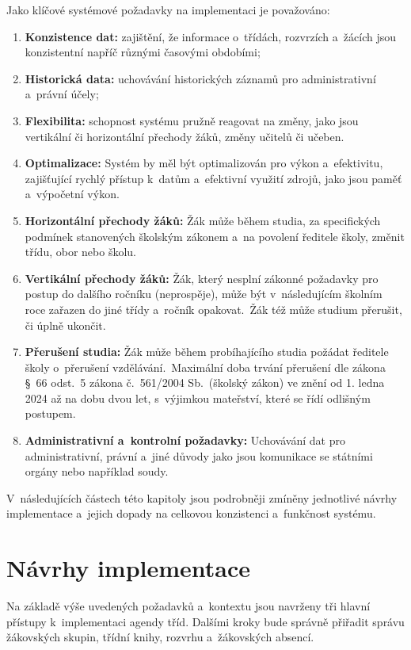 Jako klíčové systémové požadavky na implementaci je považováno:
\begin{enumerate}
    \item \textbf{Konzistence dat:}\label{req-data-consistency} zajištění, že informace o~třídách, rozvrzích a~žácích jsou konzistentní napříč různými časovými obdobími;
    \item \textbf{Historická data:}\label{req-historical-data} uchovávání historických záznamů pro administrativní a~právní účely;
    \item \textbf{Flexibilita:}\label{req-flexibility} schopnost systému pružně reagovat na změny, jako jsou vertikální či horizontální přechody žáků, změny učitelů či učeben.
    \item \textbf{Optimalizace:}\label{req-optimization} Systém by měl být optimalizován pro výkon a~efektivitu, zajišťující rychlý přístup k~datům  a~efektivní využití zdrojů, jako jsou paměť a~výpočetní výkon.
    \item \textbf{Horizontální přechody žáků:}\label{req-horizontal-student-move} Žák může během studia, za specifických podmínek stanovených školským zákonem a~na povolení ředitele školy, změnit třídu, obor nebo školu. 
    \item \textbf{Vertikální přechody žáků:}\label{req-vertical-student-move} Žák, který nesplní zákonné požadavky pro postup do dalšího ročníku (neprospěje), může být v~následujícím školním roce zařazen do jiné třídy a~ročník opakovat.~Žák též může studium přerušit, či úplně ukončit.
    \item \textbf{Přerušení studia:}\label{req-cancel-student-move} Žák může během probíhajícího studia požádat ředitele školy o~přerušení vzdělávání.~Maximální doba trvání přerušení dle zákona §~66 odst.~5 zákona č.~561/2004 Sb.~(školský zákon) ve znění od 1. ledna 2024\cite{skolsky-zakon-preruseni-obyc} až na dobu dvou let, s~výjimkou mateřství\cite{skolsky-zakon-preruseni-materstvi}, které se řídí odlišným postupem.
    \item \textbf{Administrativní a~kontrolní požadavky:}\label{req-backups} Uchovávání dat pro administrativní, právní a~jiné důvody jako jsou komunikace se státními orgány nebo například soudy.
\end{enumerate}

V~následujících částech této kapitoly jsou podrobněji zmíněny jednotlivé návrhy implementace a~jejich dopady na celkovou konzistenci a~funkčnost systému.

\section{Návrhy implementace}
Na základě výše uvedených požadavků a~kontextu jsou navrženy tři hlavní přístupy k~implementaci agendy tříd. Dalšími kroky bude správně přiřadit správu žákovských skupin, třídní knihy, rozvrhu a~žákovských absencí.

